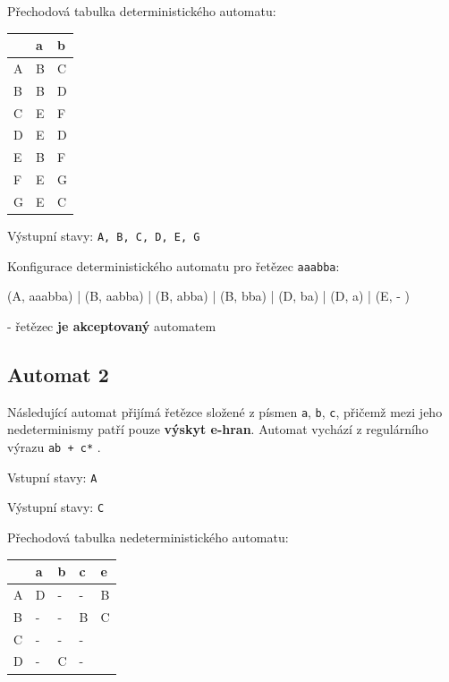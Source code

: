 \documentclass[11pt]{article}
\begin{document}
\bigskip

Přechodová tabulka deterministického automatu:

\bigskip

\begin{tabular}{| l | l | l |}
\hline
  & a & b \\ \hline
A & B & C \\ \hline
B & B & D \\ \hline
C & E & F \\ \hline
D & E & D \\ \hline
E & B & F \\ \hline
F & E & G \\ \hline
G & E & C \\
\hline
\end{tabular}

\bigskip

Výstupní stavy: \texttt{A, B, C, D, E, G}

\bigskip

Konfigurace deterministického automatu pro řetězec \texttt{aaabba}:

(A, aaabba) | (B, aabba) | (B, abba) | (B, bba) | (D, ba) | (D, a) | (E, - )

- řetězec  \textbf{je akceptovaný} automatem

\subsection{Automat 2}
Následující automat přijímá řetězce složené z písmen \texttt{a}, \texttt{b}, \texttt{c}, přičemž mezi jeho nedeterminismy patří pouze \textbf{výskyt e-hran}. Automat vychází z regulárního výrazu \texttt{ab + c*} . 

\bigskip

Vstupní stavy: \texttt{A}

Výstupní stavy: \texttt{C}

\bigskip

Přechodová tabulka nedeterministického automatu:

\bigskip

\begin{tabular}{| l | l | l | l || l |}
\hline
  & a & b & c & e \\ \hline
A & D & - & - & B \\ \hline
B & - & - & B & C \\ \hline
C & - & - & - &  \\ \hline
D & - & C & - &  \\
\hline
\end{tabular}
\end{document}
